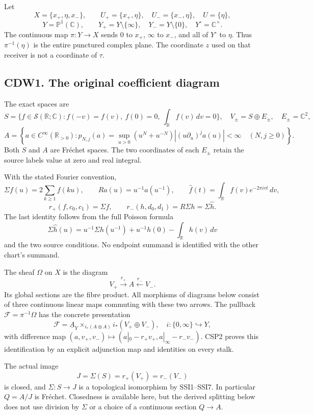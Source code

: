Let \[
X=\{x_+,\eta,x_-\},\qquad
U_+=\{x_+,\eta\},\quad U_-=\{x_-,\eta\},\quad U=\{\eta\},
\] \[
Y=\mathbb P^1(\mathbb C),\qquad
Y_+=Y\setminus\{\infty\},\quad
Y_-=Y\setminus\{0\},\quad Y^\circ=\mathbb C^\times.
\tag{CDW0.1}
\] The continuous map \(\pi:Y\to X\) sends \(0\) to \(x_+\), \(\infty\)
to \(x_-\), and all of \(Y^\circ\) to \(\eta\). Thus \(\pi^{-1}(\eta)\)
is the entire punctured complex plane. The coordinate \(z\) used on that
receiver is not a coordinate of \(\tau\).

\subsection{CDW1. The original coefficient
diagram}\label{cdw1.-the-original-coefficient-diagram}

The exact spaces are \[
S=\{f\in\mathcal S(\mathbb R;\mathbb C):
f(-v)=f(v),\ f(0)=0,\ \int_{\mathbb R}f(v)\,dv=0\},
\quad
V_\pm=S\oplus E_\pm,\quad E_\pm=\mathbb C^2,
\] \[
A=\left\{a\in C^\infty(\mathbb R_{>0}):
p_{N,j}(a)=\sup_{u>0}(u^N+u^{-N})
|(u\partial_u)^ja(u)|<\infty\quad(N,j\ge0)\right\}.
\tag{CDW1.1}
\] Both \(S\) and \(A\) are Fréchet spaces. The two coordinates of each
\(E_\pm\) retain the source labels value at zero and real integral.

With the stated Fourier convention, \[
\Sigma f(u)=2\sum_{k\ge1}f(ku),\qquad
Ra(u)=u^{-1}a(u^{-1}),\qquad
\widehat f(t)=\int_{\mathbb R}f(v)e^{-2\pi ivt}\,dv,
\] \[
r_+(f,c_0,c_1)=\Sigma f,\qquad
r_-(h,d_0,d_1)=R\Sigma h=\Sigma\widehat h.
\tag{CDW1.2}
\] The last identity follows from the full Poisson formula \[
\Sigma\widehat h(u)=u^{-1}\Sigma h(u^{-1})
+u^{-1}h(0)-\int_{\mathbb R}h(v)\,dv
\tag{CDW1.3}
\] and the two source conditions. No endpoint summand is identified with
the other chart's summand.

The sheaf \(\Omega\) on \(X\) is the diagram \[
V_+\xrightarrow{r_+}A\xleftarrow{r_-}V_-.
\tag{CDW1.4}
\] Its global sections are the fibre product. All morphisms of diagrams
below consist of three continuous linear maps commuting with these two
arrows. The pullback \(\mathscr F=\pi^{-1}\Omega\) has the concrete
presentation \[
\mathscr F=
\underline A_Y\times_{i_*(A\oplus A)}
i_*(V_+\oplus V_-),
\quad
i:\{0,\infty\}\hookrightarrow Y,
\tag{CDW1.5}
\] with difference map
\((a,v_+,v_-)\mapsto(a|_0-r_+v_+,a|_\infty-r_-v_-)\). CSP2 proves this
identification by an explicit adjunction map and identities on every
stalk.

The actual image \[
J=\Sigma(S)=r_+(V_+)=r_-(V_-)
\tag{CDW1.6}
\] is closed, and \(\Sigma:S\to J\) is a topological isomorphism by
SSI1--SSI7. In particular \(Q=A/J\) is Fréchet. Closedness is available
here, but the derived splitting below does not use division by
\(\Sigma\) or a choice of a continuous section \(Q\to A\).

